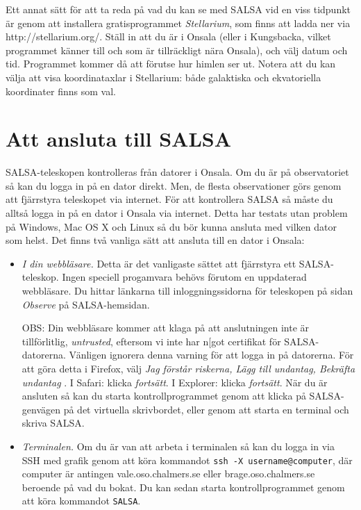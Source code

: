 Ett annat sätt för att ta reda på vad du kan se med SALSA vid en viss tidpunkt
är genom att installera gratisprogrammet \emph{Stellarium}, som finns att 
ladda ner via http://stellarium.org/. Ställ in att du är i Onsala (eller i 
Kungsbacka, vilket programmet känner till och som är tillräckligt nära Onsala),
och välj datum och tid. Programmet kommer då att förutse hur himlen ser ut. 
Notera att du kan välja att visa koordinataxlar i Stellarium: både galaktiska
och ekvatoriella koordinater finns som val.

\section{Att ansluta till SALSA} 
\label{sect:connect}
SALSA-teleskopen kontrolleras från datorer i Onsala. Om du är på 
observatoriet så kan du logga in på en dator direkt. Men, de flesta observationer
görs genom att fjärrstyra teleskopet via internet. För att kontrollera SALSA
så måste du alltså logga in på en dator i Onsala via internet. Detta har 
testats utan problem på Windows, Mac OS X och Linux så du bör kunna ansluta 
med  vilken dator som helst. Det finns två vanliga sätt att ansluta
till en dator i Onsala:

\begin{itemize}
	\item{\emph{I din webbläsare.} Detta är det vanligaste
			sättet att fjärrstyra ett SALSA-teleskop. Ingen speciell 
			progamvara behövs förutom en uppdaterad webbläsare. Du hittar länkarna
			till inloggningssidorna för teleskopen på sidan \emph{Observe} på 
			SALSA-hemsidan. 

			OBS: Din webbläsare kommer att klaga på att anslutningen inte är 
			tillförlitlig, \emph{untrusted}, eftersom vi inte har n[got
			certifikat för SALSA-datorerna. Vänligen ignorera denna varning
			för att logga in på datorerna. För att göra detta i Firefox, välj 
			\emph{Jag förstår riskerna, Lägg till undantag, Bekräfta undantag
			}. I Safari: klicka \emph{fortsätt}. I Explorer: klicka \emph{fortsätt}.  
			När du är ansluten så kan du starta kontrollprogrammet genom
			att klicka på SALSA-genvägen på det virtuella skrivbordet, eller genom att
			starta en terminal och skriva SALSA. 
		}
\item{\emph{Terminalen.} Om du är van att arbeta i terminalen så kan du 
		logga in via SSH med grafik genom att köra kommandot 
		{\tt ssh -X username@computer}, där computer är antingen vale.oso.chalmers.se eller
		brage.oso.chalmers.se beroende på vad du bokat.  Du kan sedan starta kontrollprogrammet
		genom att köra kommandot {\tt  SALSA}.}
\end{itemize}

